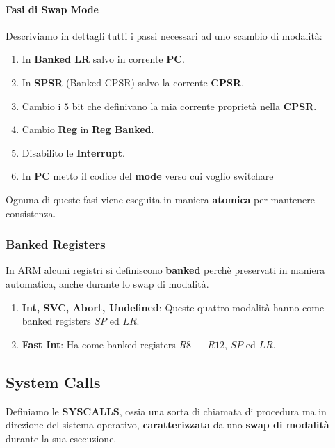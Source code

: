 \documentclass{article}
\begin{document}
\newpage

\paragraph{Fasi di Swap Mode} Descriviamo in dettagli tutti i passi necessari ad uno scambio di modalità:

\begin{enumerate}
    \item In \textbf{Banked LR} salvo in corrente \textbf{PC}.
    \item In \textbf{SPSR} (Banked CPSR) salvo la corrente \textbf{CPSR}.
    \item Cambio i $5$ bit che definivano la mia corrente proprietà nella \textbf{CPSR}.
    \item Cambio \textbf{Reg} in \textbf{Reg Banked}.
    \item Disabilito le \textbf{Interrupt}.
    \item In \textbf{PC} metto il codice del \textbf{mode} verso cui voglio switchare
\end{enumerate}

Ognuna di queste fasi viene eseguita in maniera \textbf{atomica} per mantenere consistenza.

\subsubsection{Banked Registers}

In ARM alcuni registri si definiscono \textbf{banked} perchè preservati in maniera automatica, anche durante lo swap di modalità.
\begin{enumerate}
    \item \textbf{Int, SVC, Abort, Undefined}: Queste quattro modalità hanno come banked registers $SP$ ed $LR$.
    \item \textbf{Fast Int}: Ha come banked registers $R8 \: - \: R12$, $SP$ ed $LR$.
\end{enumerate}

\subsection{System Calls}

\vspace*{5px}

Definiamo le \textbf{SYSCALLS}, ossia una sorta di chiamata di procedura ma in direzione del sistema operativo, \textbf{caratterizzata} da uno \textbf{swap di modalità} durante la sua esecuzione.
\end{document}
